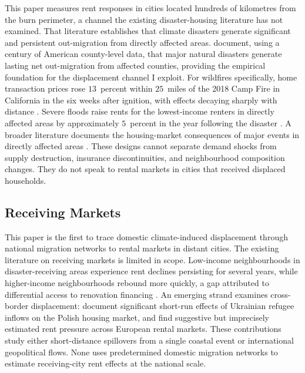 \documentclass[12pt]{article}
\begin{document}
This paper measures rent responses in cities located hundreds of kilometres
from the burn perimeter, a channel the existing disaster-housing literature
has not examined. That literature establishes that climate disasters
generate significant and persistent out-migration from directly affected
areas. \citet{boustan2020} document, using a century of American
county-level data, that major natural disasters generate lasting net
out-migration from affected counties, providing the empirical foundation
for the displacement channel I exploit. For wildfires specifically, home transaction prices rose $13$~percent
within $25$~miles of the 2018 Camp Fire in California in the six weeks
after ignition, with effects decaying sharply with distance
\citep{hennighausen2024}. Severe floods raise rents for the
lowest-income renters in directly affected areas by approximately
$5$~percent in the year following the disaster \citep{brennan2024}.
A broader literature documents the housing-market consequences of major
events in directly affected areas \citep{Vigdor2008, GallagherHartley2017,
OrtegaTaspinar2018}. These designs cannot separate demand shocks from
supply destruction, insurance discontinuities, and neighbourhood
composition changes. They do not speak to rental markets in cities
that received displaced households.

\subsection{Receiving Markets}

This paper is the first to trace domestic climate-induced displacement
through national migration networks to rental markets in distant cities.
The existing literature on receiving markets is limited in scope.
Low-income neighbourhoods in disaster-receiving areas experience rent
declines persisting for several years, while higher-income neighbourhoods
rebound more quickly, a gap attributed to differential access to
renovation financing \citep{harwood2026}. An emerging strand examines cross-border
displacement: \citet{trojanek2022} document significant short-run effects of Ukrainian refugee inflows on the Polish housing market, and \citet{czerniak2024} find suggestive but imprecisely estimated rent pressure across European rental markets. These contributions study either short-distance spillovers from
a single coastal event or international geopolitical flows. None uses
predetermined domestic migration networks to estimate receiving-city
rent effects at the national scale.
\end{document}
